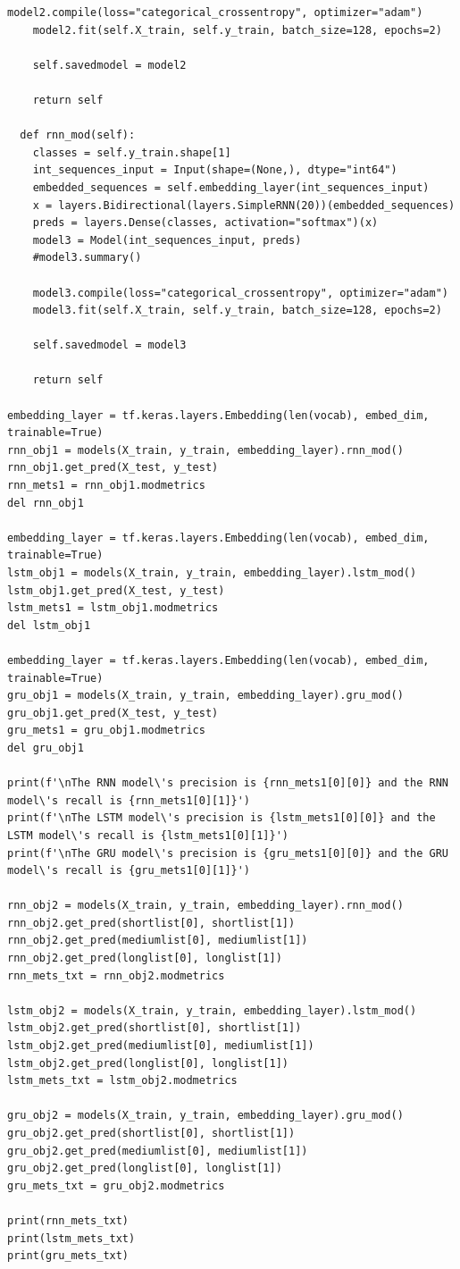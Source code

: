 \documentclass[12pt]{article}
\begin{document}
\begin{lstlisting}[breaklines]
    model2.compile(loss="categorical_crossentropy", optimizer="adam")
    model2.fit(self.X_train, self.y_train, batch_size=128, epochs=2)
    
    self.savedmodel = model2

    return self

  def rnn_mod(self):
    classes = self.y_train.shape[1]
    int_sequences_input = Input(shape=(None,), dtype="int64")
    embedded_sequences = self.embedding_layer(int_sequences_input)
    x = layers.Bidirectional(layers.SimpleRNN(20))(embedded_sequences)
    preds = layers.Dense(classes, activation="softmax")(x)
    model3 = Model(int_sequences_input, preds)
    #model3.summary()

    model3.compile(loss="categorical_crossentropy", optimizer="adam")
    model3.fit(self.X_train, self.y_train, batch_size=128, epochs=2)

    self.savedmodel = model3

    return self

embedding_layer = tf.keras.layers.Embedding(len(vocab), embed_dim, trainable=True)
rnn_obj1 = models(X_train, y_train, embedding_layer).rnn_mod()
rnn_obj1.get_pred(X_test, y_test)
rnn_mets1 = rnn_obj1.modmetrics
del rnn_obj1

embedding_layer = tf.keras.layers.Embedding(len(vocab), embed_dim, trainable=True)
lstm_obj1 = models(X_train, y_train, embedding_layer).lstm_mod()
lstm_obj1.get_pred(X_test, y_test)
lstm_mets1 = lstm_obj1.modmetrics
del lstm_obj1

embedding_layer = tf.keras.layers.Embedding(len(vocab), embed_dim, trainable=True)
gru_obj1 = models(X_train, y_train, embedding_layer).gru_mod()
gru_obj1.get_pred(X_test, y_test)
gru_mets1 = gru_obj1.modmetrics
del gru_obj1

print(f'\nThe RNN model\'s precision is {rnn_mets1[0][0]} and the RNN model\'s recall is {rnn_mets1[0][1]}')
print(f'\nThe LSTM model\'s precision is {lstm_mets1[0][0]} and the LSTM model\'s recall is {lstm_mets1[0][1]}')
print(f'\nThe GRU model\'s precision is {gru_mets1[0][0]} and the GRU model\'s recall is {gru_mets1[0][1]}')

rnn_obj2 = models(X_train, y_train, embedding_layer).rnn_mod()
rnn_obj2.get_pred(shortlist[0], shortlist[1])
rnn_obj2.get_pred(mediumlist[0], mediumlist[1])
rnn_obj2.get_pred(longlist[0], longlist[1])
rnn_mets_txt = rnn_obj2.modmetrics

lstm_obj2 = models(X_train, y_train, embedding_layer).lstm_mod()
lstm_obj2.get_pred(shortlist[0], shortlist[1])
lstm_obj2.get_pred(mediumlist[0], mediumlist[1])
lstm_obj2.get_pred(longlist[0], longlist[1])
lstm_mets_txt = lstm_obj2.modmetrics

gru_obj2 = models(X_train, y_train, embedding_layer).gru_mod()
gru_obj2.get_pred(shortlist[0], shortlist[1])
gru_obj2.get_pred(mediumlist[0], mediumlist[1])
gru_obj2.get_pred(longlist[0], longlist[1])
gru_mets_txt = gru_obj2.modmetrics

print(rnn_mets_txt)
print(lstm_mets_txt)
print(gru_mets_txt)
\end{lstlisting}
\end{document}
